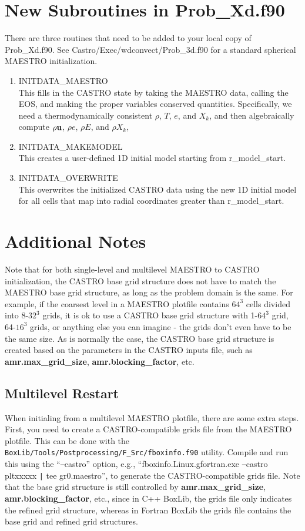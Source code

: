 \section{New Subroutines in Prob\_Xd.f90}
There are three routines that need to be added to your local copy of Prob\_Xd.f90.  See Castro/Exec/wdconvect/Prob\_3d.f90 for a standard spherical MAESTRO initialization.
\begin{enumerate}
\item INITDATA\_MAESTRO\\
This fills in the CASTRO state by taking the MAESTRO data, calling the EOS, and making the proper variables conserved quantities.  Specifically, we need a thermodynamically consistent $\rho$, $T$, $e$, and $X_k$, and then algebraically compute $\rho{\bf u}$, $\rho e$, $\rho E$, and $\rho X_k$,
\item INITDATA\_MAKEMODEL\\
This creates a user-defined 1D initial model starting from r\_model\_start.
\item INITDATA\_OVERWRITE\\
This overwrites the initialized CASTRO data using the new 1D initial model for all cells that map into radial coordinates greater than r\_model\_start.
\end{enumerate}

\section{Additional Notes}
Note that for both single-level and multilevel MAESTRO to CASTRO
initialization, the CASTRO base grid structure does not have to match
the MAESTRO base grid structure, as long as the problem domain is the
same.  For example, if the coarsest level in a MAESTRO plotfile
contains $64^3$ cells divided into 8-$32^3$ grids, it is ok to use a
CASTRO base grid structure with 1-$64^3$ grid, 64-$16^3$ grids, or
anything else you can imagine - the grids don't even have to be the
same size.  As is normally the case, the CASTRO base grid structure is
created based on the parameters in the CASTRO inputs file, such as
{\bf amr.max\_grid\_size}, {\bf amr.blocking\_factor}, etc.

\subsection{Multilevel Restart}
When initialing from a multilevel MAESTRO plotfile, there are some
extra steps.  First, you need to create a CASTRO-compatible grids file
from the MAESTRO plotfile.  This can be done with the {\tt
  BoxLib/Tools/Postprocessing/F\_Src/fboxinfo.f90} utility.  Compile
and run this using the ``\texttt{--}castro'' option, e.g.,
``fboxinfo.Linux.gfortran.exe \texttt{--}castro pltxxxxx \texttt{|}
tee gr0.maestro'', to generate the CASTRO-compatible grids file.  Note
that the base grid structure is still controlled by {\bf
  amr.max\_grid\_size}, {\bf amr.blocking\_factor}, etc., since in C++
BoxLib, the grids file only indicates the refined grid structure,
whereas in Fortran BoxLib the grids file contains the base grid and
refined grid structures.

